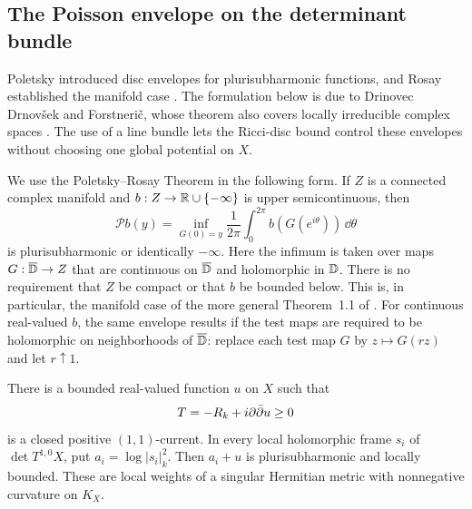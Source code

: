 \subsection{The Poisson envelope on the determinant bundle}

Poletsky introduced disc envelopes for plurisubharmonic functions,
and Rosay established the manifold case \cite{Poletsky1991,Rosay2003}.
The formulation below is due to Drinovec Drnov\v sek and Forstneri\v c,
whose theorem also covers locally irreducible complex spaces
\cite{DrinovecForstneric2012}. The use of a line bundle lets the
Ricci-disc bound control these envelopes without choosing one global
potential on $X$.

We use the Poletsky--Rosay Theorem in the following form.  If $Z$ is
a connected complex manifold and $b:Z\to\mathbb R\cup\{-\infty\}$ is upper
semicontinuous, then
\[
 \mathcal P b(y)
 =\inf_{G(0)=y}\frac{1}{2\pi}\int_0^{2\pi}b(G(e^{i\theta}))\,\dd\theta
\]
is plurisubharmonic or identically $-\infty$.  Here the infimum is
taken over maps $G:\overline{\mathbb D}\to Z$ that are continuous on
$\overline{\mathbb D}$ and holomorphic in $\mathbb D$.  There is no requirement that
$Z$ be compact or that $b$ be bounded below.  This is, in particular,
the manifold case of the more general Theorem~1.1 of
\cite{DrinovecForstneric2012}.  For continuous real-valued $b$, the
same envelope results if the test maps are required to be holomorphic
on neighborhoods of $\overline{\mathbb D}$: replace each test map $G$ by
$z\mapsto G(rz)$ and let $r\uparrow1$.

\begin{proposition}
\label{nef:bounded-potentials}
There is a bounded real-valued function $u$ on $X$ such that
\[
 T=-R_k+i\partial\bar\partial u\geq0
\]
is a closed positive $(1,1)$-current.  In every local holomorphic
frame $s_i$ of $\det T^{1,0}X$, put $a_i=\log|s_i|_k^2$.
Then $a_i+u$ is plurisubharmonic and locally bounded.  These are
local weights of a singular Hermitian metric with nonnegative
curvature on $K_X$.
\end{proposition}

